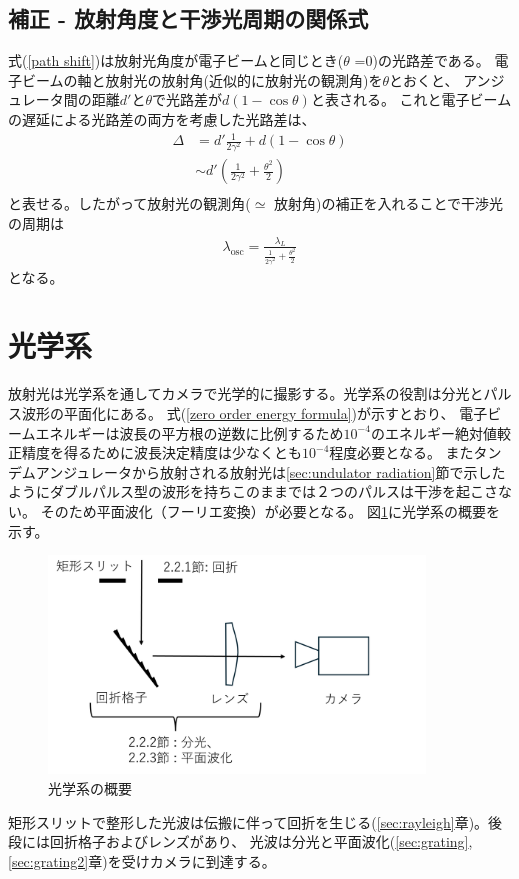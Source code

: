 \documentclass[a4paper,11pt,uplatex]{jsbook}
\begin{document}
\subsection{補正 - 放射角度と干渉光周期の関係式}
式(\ref*{path shift})は放射光角度が電子ビームと同じとき($\theta$ =0)の光路差である。
電子ビームの軸と放射光の放射角(近似的に放射光の観測角)を$\theta$とおくと、
アンジュレータ間の距離$d'$と$\theta$で光路差が$d(1-\cos{\theta})$と表される。
これと電子ビームの遅延による光路差の両方を考慮した光路差は、
\begin{eqnarray}
  \Delta &= d'\frac{1}{2\gamma^2} + d(1 - \cos{\theta}) \\
        &\sim d'(\frac{1}{2\gamma^2} + \frac{\theta^2}{2})\\
\end{eqnarray}
と表せる。したがって放射光の観測角($\simeq$ 放射角)の補正を入れることで干渉光の周期は
\begin{eqnarray}
  \lambda_{\text{osc}} = \frac{\lambda_L}{\frac{1}{2\gamma^2} + \frac{\theta^2}{2}}
\end{eqnarray}
となる。



\section{光学系}\label{sec:optics}
放射光は光学系を通してカメラで光学的に撮影する。光学系の役割は分光とパルス波形の平面化にある。
式(\ref{zero order energy formula})が示すとおり、
電子ビームエネルギーは波長の平方根の逆数に比例するため$10^{-4}$のエネルギー絶対値較正精度を得るために波長決定精度は少なくとも$10^{-4}$程度必要となる。
またタンデムアンジュレータから放射される放射光は\ref{sec:undulator radiation}節で示したようにダブルパルス型の波形を持ちこのままでは２つのパルスは干渉を起こさない。
そのため平面波化（フーリエ変換）が必要となる。
図\ref{optics_schematic}に光学系の概要を示す。
\begin{figure}[h]
  \centering
  \includegraphics[width=10cm]{image/2-opticsshematic.png}
  \caption{光学系の概要}
  \label{optics_schematic}
\end{figure}
矩形スリットで整形した光波は伝搬に伴って回折を生じる(\ref{sec:rayleigh}章)。後段には回折格子およびレンズがあり、
光波は分光と平面波化(\ref{sec:grating},\ref{sec:grating2}章)を受けカメラに到達する。
\end{document}
